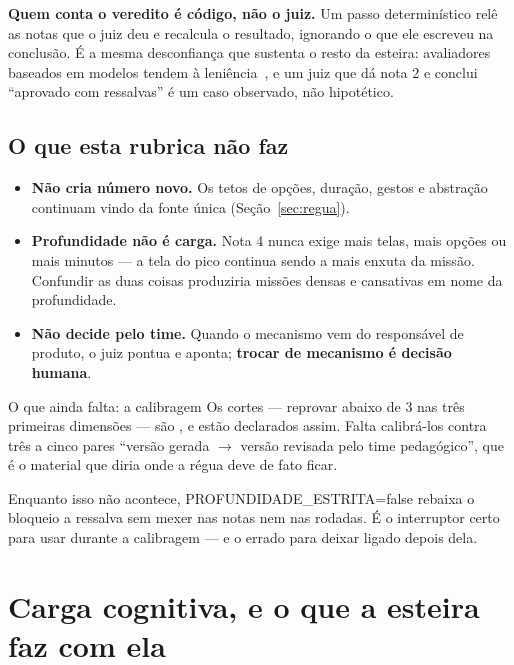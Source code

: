 \documentclass[11pt,a4paper]{article}
\newcommand{\cod}[1]{{\ttfamily\small #1}}
\newcommand{\selo}[2]{\tikz[baseline=(x.base)]{\node[fill=#1,rounded corners=1.6pt,inner xsep=3.6pt,inner ysep=1.6pt,text=white,font=\sffamily\bfseries\scriptsize] (x) {#2};}}
\newcommand{\Convencao}{\selo{unLavanda}{CONVENÇÃO}}
\begin{document}
\begin{destaque}
\textbf{Quem conta o veredito é código, não o juiz.} Um passo determinístico relê as notas que o juiz deu e recalcula o resultado, ignorando o que ele escreveu na conclusão. É a mesma desconfiança que sustenta o resto da esteira: avaliadores baseados em modelos tendem à leniência~\cite{zheng2023}, e um juiz que dá nota 2 e conclui ``aprovado com ressalvas'' é um caso observado, não hipotético.
\end{destaque}

\subsection{O que esta rubrica não faz}

\begin{itemize}
  \item \textbf{Não cria número novo.} Os tetos de opções, duração, gestos e abstração continuam vindo da fonte única (Seção~\ref{sec:regua}).
  \item \textbf{Profundidade não é carga.} Nota 4 nunca exige mais telas, mais opções ou mais minutos --- a tela do pico continua sendo a mais enxuta da missão. Confundir as duas coisas produziria missões densas e cansativas em nome da profundidade.
  \item \textbf{Não decide pelo time.} Quando o mecanismo vem do responsável de produto, o juiz pontua e aponta; \textbf{trocar de mecanismo é decisão humana}.
\end{itemize}

\begin{caixaConceito}{O que ainda falta: a calibragem}
Os cortes --- reprovar abaixo de 3 nas três primeiras dimensões --- são \Convencao, e estão declarados assim. Falta calibrá-los contra três a cinco pares ``versão gerada $\rightarrow$ versão revisada pelo time pedagógico'', que é o material que diria onde a régua deve de fato ficar.

Enquanto isso não acontece, \cod{PROFUNDIDADE\_ESTRITA=false} rebaixa o bloqueio a ressalva sem mexer nas notas nem nas rodadas. É o interruptor certo para usar durante a calibragem --- e o errado para deixar ligado depois dela.
\end{caixaConceito}

\section{Carga cognitiva, e o que a esteira faz com ela}
\end{document}
